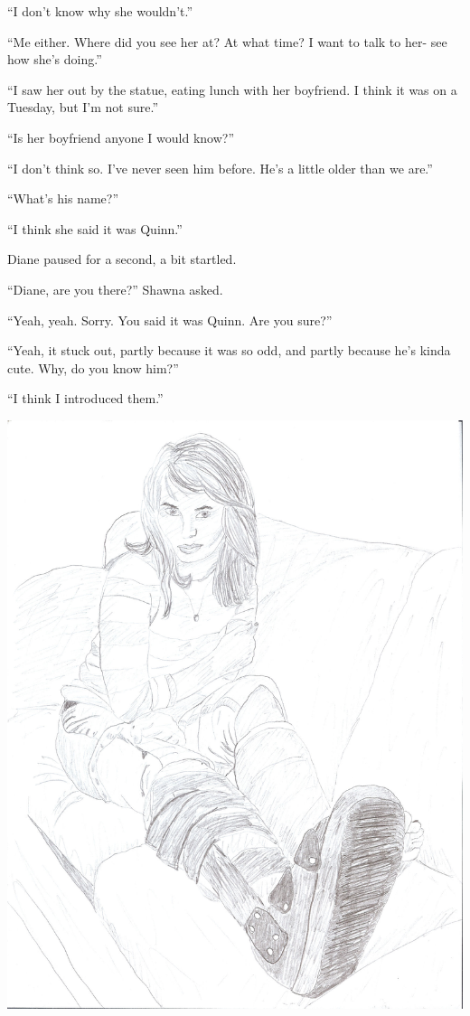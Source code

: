 ``I don't know why she wouldn't.''

``Me either. Where did you see her at? At what time? I want to talk to her- see how she's
doing.''

``I saw her out by the statue, eating lunch with her boyfriend. I think it was on a Tuesday,
but I'm not sure.''

``Is her boyfriend anyone I would know?''

``I don't think so. I've never seen him before. He's a little older than we are.''

``What's his name?''

``I think she said it was Quinn.''

Diane paused for a second, a bit startled.

``Diane, are you there?'' Shawna asked.

``Yeah, yeah. Sorry. You said it was Quinn. Are you sure?''

``Yeah, it stuck out, partly because it was so odd, and partly because he's kinda cute. Why,
do you know him?''

``I think I introduced them.''
\newpage
\begin{center}
\includegraphics[height=0.8\textheight]{images/kicks49.jpg}
\end{center}
